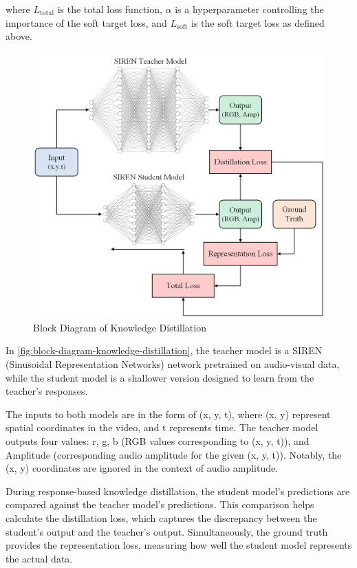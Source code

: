 \documentclass{ioereport}
\begin{document}
    where  $L_{\text{total}}$ is the total loss function, $\alpha$ is a hyperparameter controlling the importance of the soft target loss, and $L_{\text{soft}}$ is the soft target loss as defined above.
    \begin{figure}[H]
        \centering
        \includegraphics[width=0.95\linewidth]{assets/Knowledge Distillation.png}
        \caption{Block Diagram of Knowledge Distillation}
        \label{fig:block-diagram-knowledge-distillation}
    \end{figure}
    In \autoref{fig:block-diagram-knowledge-distillation}, the teacher model is a SIREN (Sinusoidal Representation Networks) network pretrained on audio-visual data, while the student model is a shallower version designed to learn from the teacher's responses.

    The inputs to both models are in the form of (x, y, t), where (x, y) represent spatial coordinates in the video, and t represents time. The teacher model outputs four values: r, g, b (RGB values corresponding to (x, y, t)), and Amplitude (corresponding audio amplitude for the given (x, y, t)). Notably, the (x, y) coordinates are ignored in the context of audio amplitude.
    
    During response-based knowledge distillation, the student model's predictions are compared against the teacher model's predictions. This comparison helps calculate the distillation loss, which captures the discrepancy between the student's output and the teacher's output. Simultaneously, the ground truth provides the representation loss, measuring how well the student model represents the actual data.
    
\end{document}
